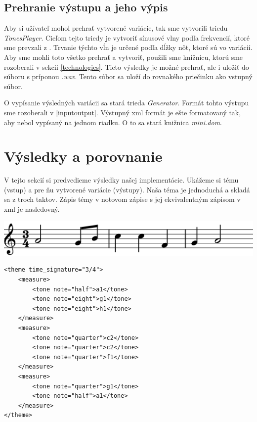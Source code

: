 \subsection{Prehranie výstupu a jeho výpis}
Aby si užívateľ mohol prehrať vytvorené variácie, tak sme vytvorili triedu \textit{TonesPlayer}. Cieľom tejto triedy je vytvoriť sínusové vlny podľa frekvencií, ktoré sme prevzali z \cite{strankaFrekvencii}. Trvanie týchto vĺn je určené podľa dĺžky nôt, ktoré sú vo variácií. Aby sme mohli toto všetko prehrať a vytvoriť, použili sme knižnicu, ktorú sme rozoberali v sekcii \ref{technologies}. Tieto výsledky je možné prehrať, ale i uložiť do súboru s príponou \textit{.wav}. Tento súbor sa uloží do rovnakého priečinku ako vstupný súbor.

O vypísanie výsledných variácii sa stará trieda \textit{Generator}. Formát tohto výstupu sme rozoberali v \ref{inputoutput}. Výstupný xml formát je ešte formatovaný tak, aby nebol vypísaný na jednom riadku. O to sa stará knižnica \textit{mini.dom}.

\section{Výsledky a porovnanie}
V tejto sekcií si predvedieme výsledky našej implementácie. Ukážeme si tému (vstup) a pre ňu vytvorené variácie (výstupy). Naša téma je jednoduchá a skladá sa z troch taktov. Zápis témy v notovom zápise s jej ekvivalentným zápisom v xml je nasledovný.

\begin{minipage}{0.45\textwidth}
\includegraphics[width=\textwidth]{thesis/obrazky-figures/theme.png}
\end{minipage}%
\begin{minipage}{0.5\textwidth}
\centering
\lstset{language=XML}
\begin{lstlisting}[basicstyle=\tiny]
<theme time_signature="3/4">
    <measure>
        <tone note="half">a1</tone>
        <tone note="eight">g1</tone>
        <tone note="eight">h1</tone>
    </measure>
    <measure>
        <tone note="quarter">c2</tone>
        <tone note="quarter">c2</tone>
        <tone note="quarter">f1</tone>
    </measure>
    <measure>
        <tone note="quarter">g1</tone>
        <tone note="half">a1</tone>
    </measure>
</theme>
\end{lstlisting}
\end{minipage}

